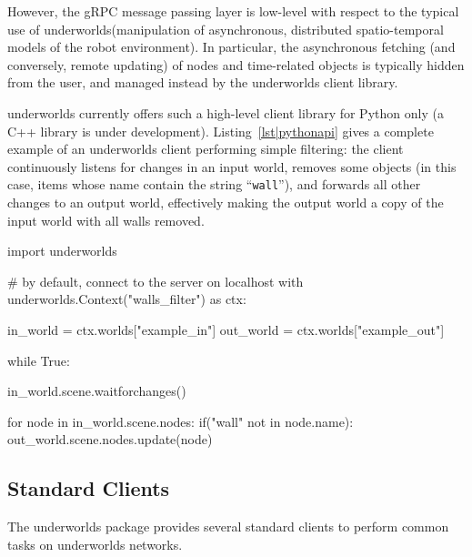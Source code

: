 \documentclass[conference]{IEEEtran}
\newcommand{\uwds}{{\sc underworlds}\xspace}
\begin{document}
However, the gRPC message passing layer is low-level with respect to the typical
use of \uwds (manipulation of asynchronous, distributed spatio-temporal models
of the robot environment). In particular, the asynchronous fetching (and
conversely, remote updating) of nodes and time-related objects is typically
hidden from the user, and managed instead by the \uwds client library.

\uwds currently offers such a high-level client library for Python only (a C++
library is under development).  Listing~\ref{lst|pythonapi} gives a complete
example of an \uwds client performing simple filtering: the client continuously
listens for changes in an input world, removes some objects (in this case, items
whose name contain the string ``{\tt wall}''), and forwards all other changes to
an output world, effectively making the output world a copy of the input world
with all walls removed.

\begin{listing}[h!]

\begin{pythoncode}
import underworlds

# by default, connect to the server on localhost
with underworlds.Context("walls_filter") as ctx:

    in_world = ctx.worlds["example_in"]
    out_world = ctx.worlds["example_out"]

    while True:

        in_world.scene.waitforchanges()

        for node in in_world.scene.nodes:
            if("wall" not in node.name):
                out_world.scene.nodes.update(node)


\end{pythoncode}
    \caption{Example of a simple yet complete \uwds filter, written in Python:
    the client connects to the \uwds network, walks through the scene graph of
    world {\tt example\_in}, filters out some objects, and publishes the
    remaining objects in the world {\tt example\_out}.}

    \label{lst|pythonapi}
\end{listing}

\subsection{Standard Clients}
\label{std_clients}

The \uwds package provides several standard clients to perform common tasks on
\uwds networks.
\end{document}
